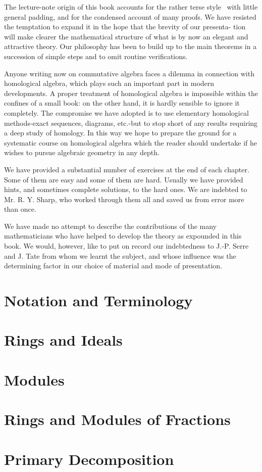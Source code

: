 \documentclass{book}
\theoremstyle{definition}
\theoremstyle{remark}
\begin{document}
\begin{refsection}
The lecture-note origin of this book accounts for the rather terse style~ with
little general padding, and for the condensed account of many proofs. We have
resisted the temptation to expand it in the hope that the brevity of our presenta-
tion will make clearer the mathematical structure of what is by now an elegant
and attractive theory. Our philosophy has been to build up to the main theorems
in a succession of simple steps and to omit routine verifications.

Anyone writing now on commutative algebra faces a dilemma in connection
with homological algebra, which plays such an important part in modern
developments. A proper treatment of homological algebra is impossible within
the confines of a small book: on the other hand, it is hardly sensible to ignore it
completely. The compromise we have adopted is to use elementary homological
methods-exact sequences, diagrams, etc.-but to stop short of any results
requiring a deep study of homology. In this way we hope to prepare the ground
for a systematic course on homological algebra which the reader should undertake
if he wishes to pursue algebraic geometry in any depth.

We have provided a substantial number of exercises at the end of each
chapter. Some of them are easy and some of them are hard. Usually we have
provided hints, and sometimes complete solutions, to the hard ones. We are
indebted to Mr. R. Y. Sharp, who worked through them all and saved us from
error more than once.

We have made no attempt to describe the contributions of the many
mathematicians who have helped to develop the theory as expounded in this
book. We would, however, like to put on record our indebtedness to J.-P. Serre
and J. Tate from whom we learnt the subject, and whose influence was the
determining factor in our choice of material and mode of presentation.
\printbibliography[heading=subbibliography]
\end{refsection}
\chapter{Notation and Terminology}
\mainmatter
\chapter{Rings and Ideals}
\chapter{Modules}
\chapter{Rings and Modules of Fractions}
\chapter{Primary Decomposition}

\end{document}

